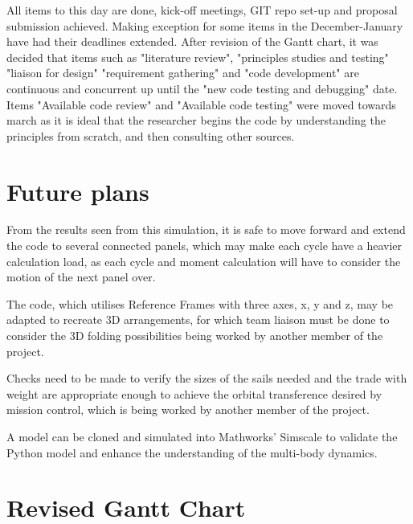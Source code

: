 All items to this day are done, kick-off meetings, GIT repo set-up and proposal submission achieved. Making exception for
some items in the December-January have had their deadlines extended. After revision
of the Gantt chart, it was decided that items such as "literature review", "principles studies and testing" "liaison for design" "requirement gathering" and "code development" are continuous and concurrent up until the "new code testing and debugging" date. Items "Available code review" and "Available code testing" were moved towards march as it is ideal that the researcher begins the code by understanding the principles from scratch, and then consulting other sources.


\section{Future plans}

From the results seen from this simulation, it is safe to move forward and extend the code to several connected panels, which may make each cycle have a heavier calculation load, as each cycle and moment calculation will have to consider the motion of the next panel over.

The code, which utilises Reference Frames with three axes, x, y and z, may be adapted to recreate 3D arrangements, for which team liaison must be done to consider the 3D folding possibilities being worked by another member of the project.

Checks need to be made to verify the sizes of the sails needed and the trade with weight are appropriate enough to achieve the orbital transference desired by mission control, which is being worked by another member of the project.

A model can be cloned and simulated into Mathworks' Simscale to validate the Python model and enhance the understanding of the multi-body dynamics.
\pagebreak


\appendix
\pagebreak
\section{Revised Gantt Chart}


